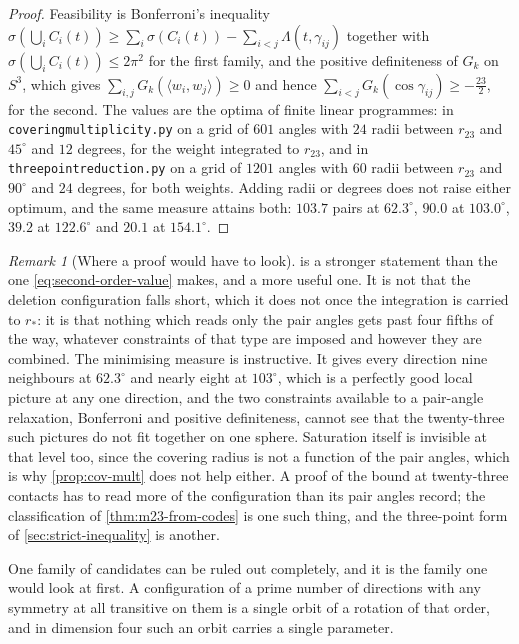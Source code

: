 \documentclass[11pt,reqno]{amsart}
\renewcommand{\_}{\origunderscore\allowbreak}
\numberwithin{equation}{section}
\theoremstyle{plain}
\theoremstyle{definition}
\theoremstyle{remark}
\newtheorem{remark}[thm]{Remark}
\begin{document}
\begin{proof}
Feasibility is Bonferroni's inequality
$\sigma(\bigcup_iC_i(t))\ge\sum_i\sigma(C_i(t))-\sum_{i<j}\Lambda(t,\gamma_{ij})$
together with $\sigma(\bigcup_iC_i(t))\le2\pi^2$ for the first family,
and the positive definiteness of $G_k$ on $S^3$, which gives
$\sum_{i,j}G_k(\langle w_i,w_j\rangle)\ge0$ and hence
$\sum_{i<j}G_k(\cos\gamma_{ij})\ge-\tfrac{23}2$, for the second. The
values are the optima of finite linear programmes: in
\texttt{covering\_multiplicity.py} on a grid of $601$ angles with $24$
radii between $r_{23}$ and $45^\circ$ and $12$ degrees, for the weight
integrated to $r_{23}$, and in \texttt{three\_point\_reduction.py} on a
grid of $1201$ angles with $60$ radii between $r_{23}$ and $90^\circ$
and $24$ degrees, for both weights. Adding radii or degrees does not
raise either optimum, and the same measure attains both: $103.7$ pairs
at $62.3^\circ$, $90.0$ at $103.0^\circ$, $39.2$ at $122.6^\circ$ and
$20.1$ at $154.1^\circ$.
\end{proof}

\begin{remark}[Where a proof would have to look]\label{rem:two-point-barrier}
 is a stronger statement than the one
\eqref{eq:second-order-value} makes, and a more useful one. It is not
that the deletion configuration falls short, which it does not once the
integration is carried to $r_*$: it is that nothing which reads only
the pair angles gets past four fifths of the way, whatever constraints
of that type are imposed and however they are combined. The minimising
measure is instructive. It gives every direction nine neighbours at
$62.3^\circ$ and nearly eight at $103^\circ$, which is a perfectly good
local picture at any one direction, and the two constraints available
to a pair-angle relaxation, Bonferroni and positive definiteness, cannot
see that the twenty-three such pictures do not fit together on one
sphere. Saturation itself is invisible at that level too, since the
covering radius is not a function of the pair angles, which is why
\cref{prop:cov-mult} does not help either. A proof of the bound at
twenty-three contacts has to read more of the configuration than its
pair angles record; the classification of \cref{thm:m23-from-codes} is
one such thing, and the three-point form of
\cref{sec:strict-inequality} is another.
\end{remark}

One family of candidates can be ruled out completely, and it is the family
one would look at first. A configuration of a prime number of directions
with any symmetry at all transitive on them is a single orbit of a rotation
of that order, and in dimension four such an orbit carries a single
parameter.
\end{document}
